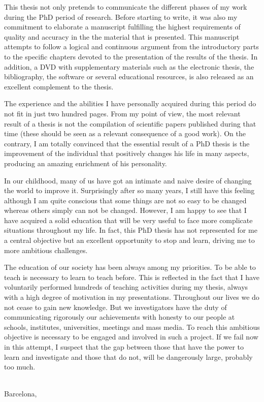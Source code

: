 This thesis not only pretends to communicate the different phases of my work during the PhD
period of research. Before starting to write, it was also my commitment to elaborate a
manuscript fulfilling the highest requirements of quality and accuracy in the 
the material that is presented. This manuscript attempts to follow a logical and continuous 
argument from the introductory parts to the specific chapters devoted to the presentation 
of the results of the thesis. In addition, a DVD with supplementary materials such as 
the electronic thesis, the bibliography, the software or several educational resources, 
is also released as an excellent complement to the thesis.

The experience and the abilities I have personally acquired during this period do not fit in 
just two hundred pages. From my point of view, the most relevant result of a thesis is not
the compilation of scientific papers published during that time (these should be seen as a 
relevant consequence of a good work). On the contrary, I am totally convinced that the essential 
result of a PhD thesis is the improvement of the individual that positively changes his life 
in many aspects, producing an amazing enrichment of his personality.

In our childhood, many of us have got an intimate and naive desire of changing the 
world to improve it. Surprisingly after so many years, I still have this feeling although 
I am quite conscious that some things are not so easy to be changed whereas others simply 
can not be changed. However, I am happy to see that I have acquired a solid education that 
will be very useful to face more complicate situations throughout my life. In fact, this PhD thesis 
has not represented for me a central objective but an excellent opportunity to stop and learn, 
driving me to more ambitious challenges.

The education of our society has been always among my priorities. To be able to teach is necessary 
to learn to teach before. This is reflected in the fact that I have voluntarily performed hundreds 
of teaching activities during my thesis, always with a high degree of motivation in my presentations. 
Throughout our lives we do not cease to gain new knowledge. But we investigators have the duty of 
communicating rigorously our achievements with honesty to our people at schools, institutes, universities, 
meetings and mass media. To reach this ambitious objective is necessary to be engaged and involved 
in such a project. If we fail now in this attempt, I suspect that the gap between those that have 
the power to learn and investigate and those that do not, will be dangerously large, probably too much. 


\begin{flushright}
\\
Barcelona, \thydate\\
\end{flushright}



